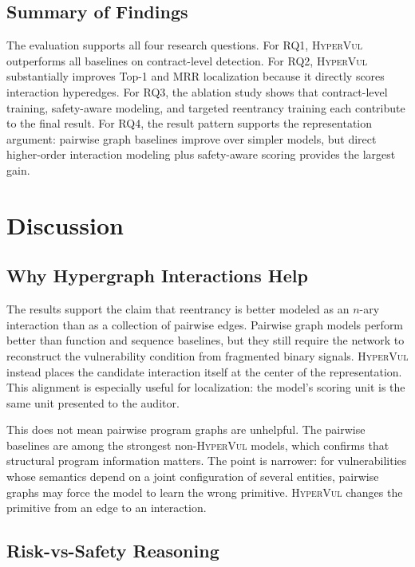 \documentclass[conference]{IEEEtran}
\newcommand{\tool}{\textsc{HyperVul}}
\begin{document}
\subsection{Summary of Findings}

The evaluation supports all four research questions. For RQ1, \tool{} outperforms all baselines on contract-level detection. For RQ2, \tool{} substantially improves Top-1 and MRR localization because it directly scores interaction hyperedges. For RQ3, the ablation study shows that contract-level training, safety-aware modeling, and targeted reentrancy training each contribute to the final result. For RQ4, the result pattern supports the representation argument: pairwise graph baselines improve over simpler models, but direct higher-order interaction modeling plus safety-aware scoring provides the largest gain.

\section{Discussion}

\subsection{Why Hypergraph Interactions Help}

The results support the claim that reentrancy is better modeled as an $n$-ary interaction than as a collection of pairwise edges. Pairwise graph models perform better than function and sequence baselines, but they still require the network to reconstruct the vulnerability condition from fragmented binary signals. \tool{} instead places the candidate interaction itself at the center of the representation. This alignment is especially useful for localization: the model's scoring unit is the same unit presented to the auditor.

This does not mean pairwise program graphs are unhelpful. The pairwise baselines are among the strongest non-\tool{} models, which confirms that structural program information matters. The point is narrower: for vulnerabilities whose semantics depend on a joint configuration of several entities, pairwise graphs may force the model to learn the wrong primitive. \tool{} changes the primitive from an edge to an interaction.

\subsection{Risk-vs-Safety Reasoning}
\end{document}
